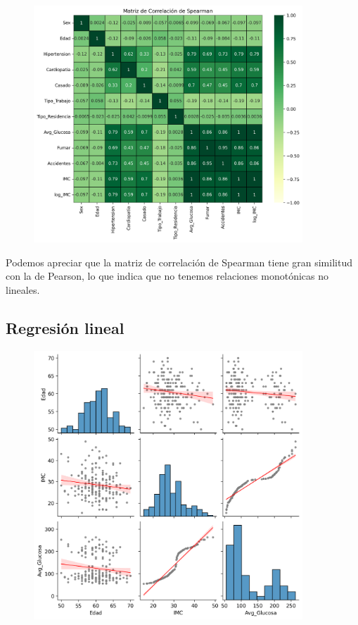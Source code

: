 \documentclass[a4paper, 12pt]{article}
\begin{document}
\begin{figure}[H]
    \centering
    \includegraphics[width=0.9\textwidth]{img/matriz_correlacion_spearman.png}
\end{figure}

Podemos apreciar que la matriz de correlación de Spearman tiene gran similitud con la de Pearson, lo que indica que no tenemos relaciones monotónicas no lineales.


\subsection{Regresión lineal}

\begin{figure}[H]
    \centering
    \includegraphics[width=0.9\textwidth]{img/matriz_regresion_lineal.png}
\end{figure}
\end{document}
